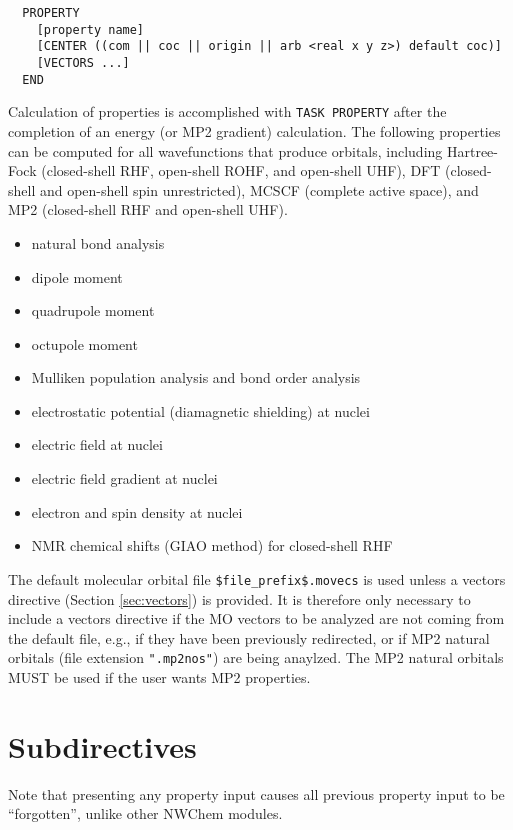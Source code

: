 \label{sec:property}
\begin{verbatim}
  PROPERTY
    [property name]
    [CENTER ((com || coc || origin || arb <real x y z>) default coc)]
    [VECTORS ...]
  END
\end{verbatim}

Calculation of properties is accomplished with \verb+TASK PROPERTY+
after the completion of an energy (or MP2 gradient) calculation.  The
following properties can be computed for all wavefunctions that produce
orbitals, including Hartree-Fock (closed-shell RHF, open-shell ROHF, and
open-shell UHF), DFT (closed-shell and open-shell spin unrestricted),
MCSCF (complete active space), and MP2 (closed-shell RHF and open-shell
UHF).

\begin{itemize}
\item natural bond analysis
\item dipole moment
\item quadrupole moment
\item octupole moment
\item Mulliken population analysis and bond order analysis
\item electrostatic potential (diamagnetic shielding) at nuclei 
\item electric field at nuclei 
\item electric field gradient at nuclei 
\item electron and spin density at nuclei 
\item NMR chemical shifts (GIAO method) for closed-shell RHF
\end{itemize}

The default molecular orbital file \verb+$file_prefix$.movecs+ is used
unless a vectors directive (Section \ref{sec:vectors}) is provided.  It is
therefore only necessary to include a vectors directive if the MO vectors
to be analyzed are not coming from the default file, e.g., if they have
been previously redirected, or if MP2 natural orbitals (file extension
\verb+".mp2nos"+) are being anaylzed.  The MP2 natural orbitals MUST be
used if the user wants MP2 properties.

\section{Subdirectives}

Note that presenting any property input causes all previous property input
to be ``forgotten'', unlike other NWChem modules.

